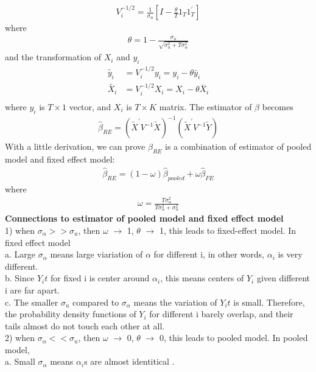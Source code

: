 \documentclass[a4paper]{article}
\begin{document}
\begin{align*}
V_i^{-1/2} = \frac{1}{\sigma_u}[I-\frac{\theta}{T} 1_T 1^{'}_T]
\end{align*}
where
\begin{align*}
\theta = 1 - \frac{\sigma_u}{\sqrt{\sigma^2_u + T \sigma^2_{\alpha}}}
\end{align*}
and the transformation of $X_i$ and $y_i$
\begin{align*}
\tilde{y_i} & = V_i^{-1/2}y_i = y_i - \theta \bar y_i\\
\tilde{X_{i}} & = V_i^{-1/2}X_{i} = X_i - \theta \bar X_i\\
\end{align*}
where $y_i$ is $T\times 1$ vector, and $X_{i}$ is $T \times K$ matrix.  The estimator of $\beta$ becomes
\begin{align*}
\hat \beta_{RE} = (\tilde X^{'}V^{-1}\tilde X)^{-1} (\tilde X^{'}V^{-1}\tilde Y)
\end{align*}
With a little derivation, we can prove $\beta_{RE}$ is a combination of estimator of pooled model and fixed effect model:
\begin{align*}
\hat \beta_{RE} = (1-\omega)\hat \beta_{pooled} + \omega \hat \beta_{FE}
\end{align*}
where
\begin{align*}
\omega = \frac{T\sigma^2_{\alpha}}{T\sigma^2_{\alpha} + \sigma^2_u}
\end{align*}
{\bf Connections to estimator of pooled model and fixed effect model}\\
1) when $\sigma_{\alpha} >> \sigma_u$, then $\omega$ $\rightarrow$ 1, $\theta$ $\rightarrow$ 1,  this leads to fixed-effect model. In fixed effect model\\
a. Large $\sigma_{\alpha}$ means large viariation of $\alpha$ for different i, in other words, $\alpha_i$ is very different.\\
b. Since $Y_it$ for fixed i is center around $\alpha_i$, this means centers of $Y_i$ given different i are far apart.\\
c. The smaller $\sigma_u$ compared to $\sigma_{\alpha}$ means the variation of $Y_it$ is small. Therefore, the probability density functions of $Y_i$ for different i barely overlap, and their tails almost do not touch each other at all.\\
2) when $\sigma_{\alpha} << \sigma_u$, then $\omega$ $\rightarrow$ 0, $\theta$ $\rightarrow$ 0, this leads to pooled model. In pooled model,\\
a. Small $\sigma_{\alpha}$ means $\alpha_i$s are almost identitical .\\
\end{document}
